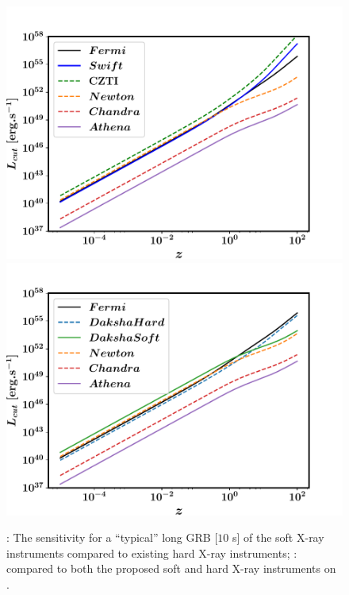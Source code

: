 \begin{figure}
\begin{center}
\includegraphics[scale=0.42]{sensitivity_plot--with_Swift_and_CZTI}
\includegraphics[scale=0.42]{sensitivity_plot--soft_Xray_instruments}
\caption[Sensitivity of several detectors to long GRBs]{\eL: The sensitivity for a ``typical'' long GRB [$10$ s] of the soft X-ray instruments compared to existing hard X-ray instruments; \eR: compared to both the proposed soft and hard X-ray instruments on \D.}
\label{fig:sensitivity_plots_for_soft_and_hard_instruments}
\end{center}
\end{figure}

